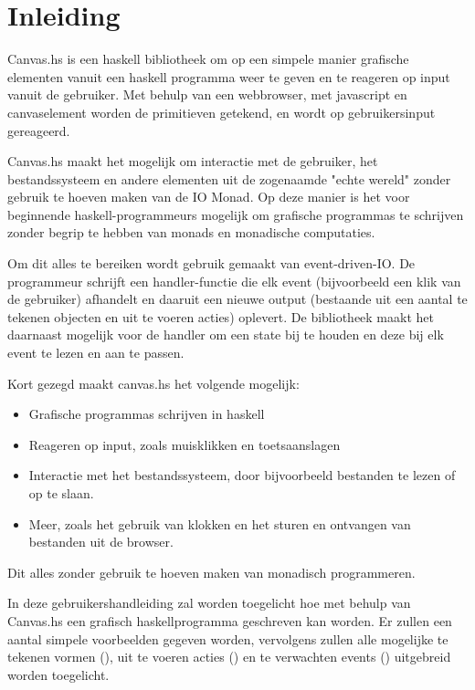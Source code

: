 \section{Inleiding}

Canvas.hs is een haskell bibliotheek om op een simpele manier grafische elementen vanuit een haskell programma weer te geven en te reageren op input vanuit de gebruiker. Met behulp van een webbrowser, met javascript en canvaselement worden de primitieven getekend, en wordt op gebruikersinput gereageerd.

Canvas.hs maakt het mogelijk om interactie met de gebruiker, het bestandssysteem en andere elementen uit de zogenaamde "echte wereld" zonder gebruik te hoeven maken van de IO Monad. Op deze manier is het voor beginnende haskell-programmeurs mogelijk om grafische programmas te schrijven zonder begrip te hebben van monads en monadische computaties.

Om dit alles te bereiken wordt gebruik gemaakt van event-driven-IO. De programmeur schrijft een handler-functie die elk event (bijvoorbeeld een klik van de gebruiker) afhandelt en daaruit een nieuwe output (bestaande uit een aantal te tekenen objecten en uit te voeren acties) oplevert. De bibliotheek maakt het daarnaast mogelijk voor de handler om een state bij te houden en deze bij elk event te lezen en aan te passen. 

Kort gezegd maakt canvas.hs het volgende mogelijk:
\begin{itemize}
	\item Grafische programmas schrijven in haskell
	\item Reageren op input, zoals muisklikken en toetsaanslagen
	\item Interactie met het bestandssysteem, door bijvoorbeeld bestanden te lezen of op te slaan.
	\item Meer, zoals het gebruik van klokken en het sturen en ontvangen van bestanden uit de browser.
\end{itemize}
Dit alles zonder gebruik te hoeven maken van monadisch programmeren. 


In deze gebruikershandleiding zal worden toegelicht hoe met behulp van Canvas.hs een grafisch haskellprogramma geschreven kan worden. Er zullen een aantal simpele voorbeelden gegeven worden, vervolgens zullen alle mogelijke te tekenen vormen (\shapes), uit te voeren acties (\actions) en te verwachten events (\events) uitgebreid worden toegelicht. 